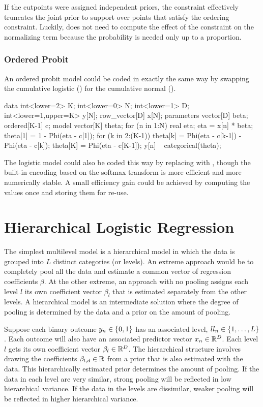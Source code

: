 If the cutpoints were assigned independent priors, the constraint
effectively truncates the joint prior to support over points that
satisfy the ordering constraint.  Luckily, \Stan does not need to
compute the effect of the constraint on the normalizing term because
the probability is needed only up to a proportion.


\subsubsection{Ordered Probit}

An ordered probit model could be coded in exactly the same way by
swapping the cumulative logistic () for the cumulative
normal ().
%

\begin{stancode}
data {
  int<lower=2> K;
  int<lower=0> N;
  int<lower=1> D;
  int<lower=1,upper=K> y[N];
  row_vector[D] x[N];
}
parameters {
  vector[D] beta;
  ordered[K-1] c;
}
model {
  vector[K] theta;
  for (n in 1:N) {
    real eta;
    eta = x[n] * beta;
    theta[1] = 1 - Phi(eta - c[1]);
    for (k in 2:(K-1))
      theta[k] = Phi(eta - c[k-1]) - Phi(eta - c[k]);
    theta[K] = Phi(eta - c[K-1]);
    y[n] ~ categorical(theta);
  }
}
\end{stancode}
%
The logistic model could also be coded this way by replacing
 with , though the built-in encoding based
on the softmax transform is more efficient and more numerically
stable.  A small efficiency gain could be achieved by computing the
values  once and storing them for re-use.


\section{Hierarchical Logistic Regression}

The simplest multilevel model is a hierarchical model in which the
data is grouped into $L$ distinct categories (or levels).  An extreme
approach would be to completely pool all the data and estimate a
common vector of regression coefficients $\beta$.  At the other
extreme, an approach with no pooling assigns each level $l$ its own
coefficient vector $\beta_l$ that is estimated separately from the
other levels.  A hierarchical model is an intermediate solution where
the degree of pooling is determined by the data and a prior on the
amount of pooling.

Suppose each binary outcome $y_n \in \setlist{0,1}$ has an associated
level, $ll_n \in \setlist{1,\ldots,L}$.  Each outcome will also have
an associated predictor vector $x_n \in \reals^D$.  Each level $l$
gets its own coefficient vector $\beta_l \in \reals^D$.  The
hierarchical structure involves drawing the coefficients $\beta_{l,d}
\in \reals$ from a prior that is also estimated with the data.  This
hierarchically estimated prior determines the amount of pooling.  If
the data in each level are very similar, strong pooling will be
reflected in low hierarchical variance.  If the data in the levels are
dissimilar, weaker pooling will be reflected in higher hierarchical variance.

